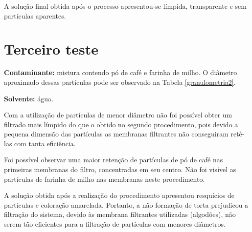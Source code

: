 A solução final obtida após o processo apresentou-se límpida, transparente e sem
partículas aparentes.


\section{Terceiro teste}
\label{sec:proc3}

\textbf{Contaminante:} mistura contendo pó de café e farinha de milho. O
diâmetro aproximado dessas partículas pode ser observado na Tabela
\ref{granulometria2}.

\textbf{Solvente:} água.

Com a utilização de partículas de menor diâmetro não foi possível obter um
filtrado mais límpido do que o obtido no segundo procedimento, pois devido a
pequena dimensão das partículas as membranas filtrantes não conseguiram retê-las
com tanta eficiência.

Foi possível observar uma maior retenção de partículas de pó de café nas
primeiras membranas do filtro, concentradas em seu centro. Não foi visível as
partículas de farinha de milho nas membranas neste procedimento.

A solução obtida após a realização do procedimento apresentou resquícios de
partículas e coloração amarelada. Portanto, a não formação de torta prejudicou a
filtração do sistema, devido às membrana filtrantes utilizadas (algodões), não
serem tão eficientes para a filtração de partículas com menores diâmetros.



